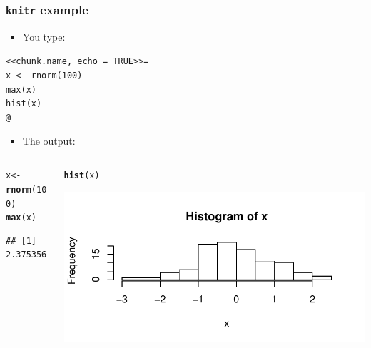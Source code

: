 \documentclass[]{beamer}\usepackage[]{graphicx}\usepackage[]{color}
\makeatletter
\newcommand{\hlnum}[1]{\textcolor[rgb]{0.686,0.059,0.569}{#1}}%
\newcommand{\hlstd}[1]{\textcolor[rgb]{0.345,0.345,0.345}{#1}}%
\newcommand{\hlkwb}[1]{\textcolor[rgb]{0.69,0.353,0.396}{#1}}%
\newcommand{\hlkwd}[1]{\textcolor[rgb]{0.737,0.353,0.396}{\textbf{#1}}}%
\newenvironment{kframe}{%
 \def\at@end@of@kframe{}%
 \ifinner\ifhmode%
  \def\at@end@of@kframe{\end{minipage}}%
  \begin{minipage}{\columnwidth}%
 \fi\fi%
 \def\FrameCommand##1{\hskip\@totalleftmargin \hskip-\fboxsep
 \colorbox{shadecolor}{##1}\hskip-\fboxsep
     \hskip-\linewidth \hskip-\@totalleftmargin \hskip\columnwidth}%
 \MakeFramed {\advance\hsize-\width
   \@totalleftmargin\z@ \linewidth\hsize
   \@setminipage}}%
 {\par\unskip\endMakeFramed%
 \at@end@of@kframe}
\newenvironment{knitrout}{}{} %
\makeatother
\begin{document}
\begin{frame}[fragile, label=c]
\frametitle[knitr example]{\texttt{knitr} example}

	\begin{itemize}
		\item You type:
	\end{itemize}
\texttt{<<chunk.name, echo = TRUE>>=} \\
\texttt{x <- rnorm(100)} \\
\texttt{max(x)} \\
\texttt{hist(x)} \\
\texttt{@}

	\begin{itemize}
		\item The output:
	\end{itemize}
	
	\vspace{-5mm}
	\begin{columns}
		\begin{column}{0.5\textwidth}
\begin{knitrout}\small
{}\color{fgcolor}\begin{kframe}
\begin{alltt}
\hlstd{x} \hlkwb{<-} \hlkwd{rnorm}\hlstd{(}\hlnum{100}\hlstd{)}
\hlkwd{max}\hlstd{(x)}
\end{alltt}
\begin{verbatim}
## [1] 2.375356
\end{verbatim}
\end{kframe}
\end{knitrout}
		\vspace{18mm}
		\end{column}
		\begin{column}{0.5\textwidth}
\begin{knitrout}\small
{}\color{fgcolor}\begin{kframe}
\begin{alltt}
\hlkwd{hist}\hlstd{(x)}
\end{alltt}
\end{kframe}

{\centering \includegraphics[width=1\linewidth]{figure/chunk_name2-1} 

}



\end{knitrout}
		\end{column}
	\end{columns}

\end{frame}
\end{document}
